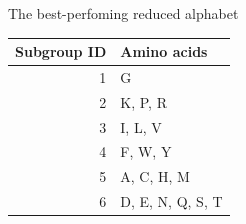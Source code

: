\documentclass{beamer}\usepackage[]{graphicx}\usepackage[]{color}
\begin{document}
     \begin{frame}{The best-perfoming reduced alphabet}

   \begin{table}[ht]
\centering
\begin{tabular}{rl}
  \toprule
Subgroup ID & Amino acids \\ 
  \midrule
  1 & G \\ 
   \rowcolor[gray]{0.85}  2 & K, P, R \\ 
    3 & I, L, V \\ 
   \rowcolor[gray]{0.85}  4 & F, W, Y \\ 
    5 & A, C, H, M \\ 
   \rowcolor[gray]{0.85}  6 & D, E, N, Q, S, T \\ 
   \bottomrule
\end{tabular}
\end{table}
   
   \end{frame}

  
\end{document}
